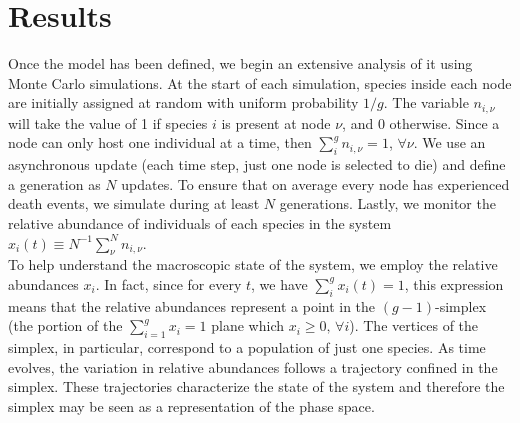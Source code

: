 \section{\label{chp1:2}Results}
Once the model has been defined, we begin an extensive analysis of it using Monte Carlo simulations. At the start of each simulation, species inside each node are initially assigned at random with  uniform probability $1/g$. The variable $n_{i,\nu}$ will take the value of 1 if species $i$ is present at node $\nu$, and $0$ otherwise. Since a node can only host one individual at a time, then $\sum_i^g n_{i,\nu}=1$, $\forall \nu$. We use an asynchronous update (each time step, just one node is selected to die) and define a generation as $N$ updates. To ensure that on average every node has experienced death events, we simulate during at least $N$ generations. Lastly, we monitor the relative abundance of individuals of each species in the system $x_i(t) \equiv N^{-1}\sum_\nu^N n_{i,\nu}$. \\

To help understand the  macroscopic state of the system, we employ the relative abundances $x_i$. In fact, since for every $t$, we have $\sum_{i}^{g} x_i(t) = 1$, this expression means that the relative abundances represent a point in the $(g-1)$-simplex (the portion of the $\sum_{i=1}^{g} x_i=1$ plane which $x_i \geq 0, \, \forall i$). The vertices of the simplex, in particular, correspond to a population of just one species. As time evolves, the variation in relative abundances follows a trajectory confined in the simplex. These trajectories characterize the state of the system and therefore the simplex may be seen as a representation of the phase space. \\


